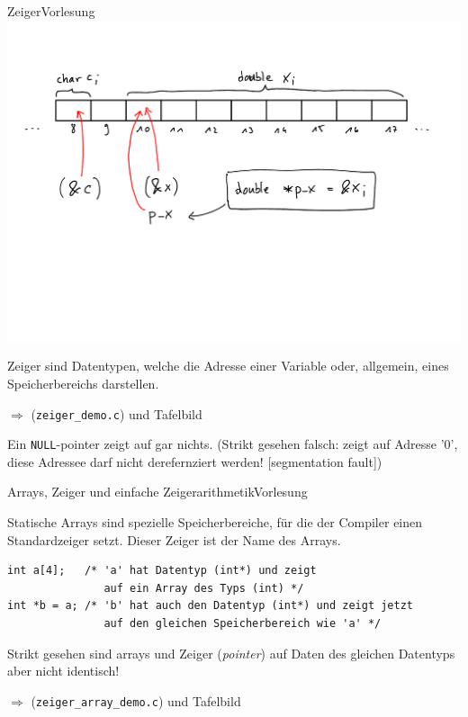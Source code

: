 \documentclass[xcolor=dvipsnames]{beamer}
\newcounter{lecturecounter}
\begin{document}
\begin{frame}[fragile]{Zeiger}{Vorlesung }
  \includegraphics[width=\textwidth,page=1,trim=0 7cm 0 2cm,clip=true]{graphics/c_kurs_tafel}
  \begin{block}{}
    Zeiger sind Datentypen, welche die Adresse einer Variable oder, allgemein, eines Speicherbereichs darstellen.
  \end{block}
  $\Rightarrow$ (\texttt{zeiger\_demo.c}) und Tafelbild
  \begin{block}{}
    Ein \texttt{NULL}-pointer zeigt auf gar nichts. (Strikt gesehen falsch: zeigt auf Adresse '0', diese Adressee darf nicht derefernziert werden! [segmentation fault])
  \end{block}
\end{frame}

\begin{frame}[fragile]{Arrays, Zeiger und einfache Zeigerarithmetik}{Vorlesung }
  \begin{block}{}
    Statische Arrays sind spezielle Speicherbereiche, für die der Compiler einen Standardzeiger setzt. Dieser Zeiger ist der Name des Arrays.
  \end{block}
\begin{lstlisting}
int a[4];   /* 'a' hat Datentyp (int*) und zeigt  
               auf ein Array des Typs (int) */
int *b = a; /* 'b' hat auch den Datentyp (int*) und zeigt jetzt
               auf den gleichen Speicherbereich wie 'a' */
\end{lstlisting}
\begin{block}{}
  Strikt gesehen sind arrays und Zeiger (\emph{pointer}) auf Daten des gleichen Datentyps aber nicht identisch!
\end{block}
 $\Rightarrow$ (\texttt{zeiger\_array\_demo.c}) und Tafelbild

\end{frame}
\end{document}
